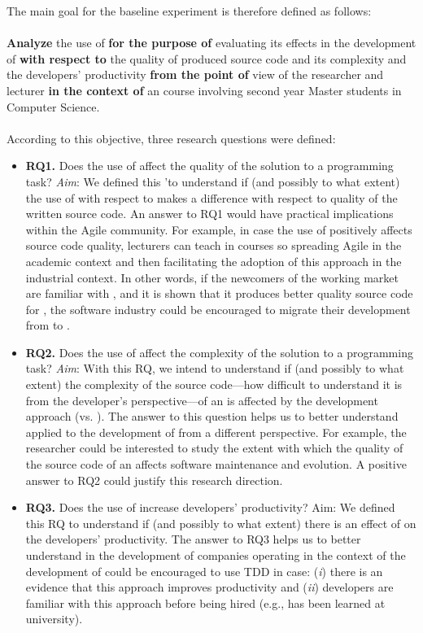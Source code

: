 The main goal for the baseline experiment is therefore defined as follows:
\\ \ \\
\noindent
\textbf{Analyze} the use of \tdd 
\textbf{for the purpose of} evaluating its effects in the development of \ess
\textbf{with respect to} the quality of produced source code and its complexity and the developers' productivity 
\textbf{from the point of} view of the researcher and lecturer 
\textbf{in the context of} an \es course involving second year Master students in Computer Science.
\\ \ \\

According to this objective, three research questions were defined:
\begin{itemize}
    \item \textbf{RQ1.} Does the use of \tdd affect the quality of the solution to a programming task? 
    \textit{Aim}: We defined this \rq to understand if (and possibly to what extent) the use of \tdd with respect to \yw makes a difference with respect to quality of the written source code. An answer to RQ1 would have practical implications within the Agile community. For example, in case the use of \tdd positively affects source code quality, lecturers can teach \tdd in \es courses so spreading Agile in the academic context and then facilitating the adoption of this approach in the industrial context. In other words, if the newcomers of the working market are familiar with \tdd, and it is shown that it produces better quality source code for \ess, the software industry could be encouraged to migrate their development from \yw to \tdd.
    \item \textbf{RQ2.} Does the use of \tdd affect the complexity of the solution to a programming task?
    \textit{Aim}: With this RQ, we intend to understand if (and possibly to what extent) the complexity of the source code—how difficult to understand it is from the developer's perspective—of an \es is affected by the development approach (\tdd vs. \yw). The answer to this question helps us to better understand \tdd applied to the development of \ess from a different perspective. For example, the researcher could be interested to study the extent with which the quality of the source code of an \es affects software maintenance and evolution. A positive answer to RQ2 could justify this research direction.
    \item \textbf{RQ3.} Does the use of \tdd increase developers' productivity?
    Aim: We defined this RQ to understand if (and possibly to what extent) there is an effect of \tdd on the developers’ productivity. The answer to RQ3 helps us to better understand \tdd in the development of \ess companies operating in the context of the development of \ess could be encouraged to use TDD in case: (\textit{i}) there is an evidence that this approach improves productivity and (\textit{ii}) developers are familiar with this approach before being hired (e.g., \tdd has been learned at university).
\end{itemize}



